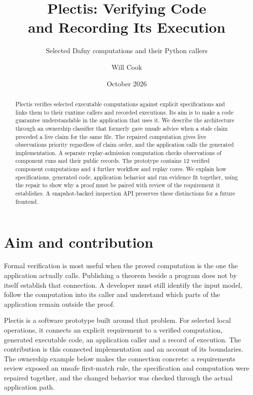 \documentclass[11pt]{article}
\title{Plectis: Verifying Code\\and Recording Its Execution}
\subtitle{Selected Dafny computations and their Python callers}
\author{Will Cook}
\date{October 2026}
\newcommand{\formalcomponentcount}{12}
\newcommand{\workflowcorecount}{4}
\begin{document}
\maketitle
{}

\begin{abstract}
Plectis verifies selected executable computations against explicit specifications
and links them to their runtime callers and recorded executions. Its aim is to
make a code guarantee understandable in the application that uses it. We
describe the architecture through an ownership classifier that formerly gave
unsafe advice when a stale claim preceded a live claim for the same file.
The repaired computation gives live observations priority regardless of claim
order, and the application calls the generated implementation. A separate
replay-admission computation checks observations of component runs and their
public records. The prototype contains \formalcomponentcount{} verified
component computations and \workflowcorecount{} further workflow and replay
cores. We explain how specifications, generated code, application behavior and
run evidence fit together, using the repair to show why a proof must be paired
with review of the requirement it establishes. A snapshot-backed inspection API
preserves these distinctions for a future frontend.
\end{abstract}

\section{Aim and contribution}
\label{sec:purpose}
Formal verification is most useful when the proved computation is the one the
application actually calls. Publishing a theorem beside a program does not
by itself establish that connection. A developer must still identify the input
model, follow the computation into its caller and understand which parts of the
application remain outside the proof.

Plectis is a software prototype built around that problem. For selected local
operations, it connects an explicit requirement to a verified computation,
generated executable code, an application caller and a record of execution.
The contribution is this connected implementation and an account of its
boundaries. The ownership example below makes the connection concrete: a
requirements review exposed an unsafe first-match rule, the specification and
computation were repaired together, and the changed behavior was checked through
the actual application path.
\end{document}
